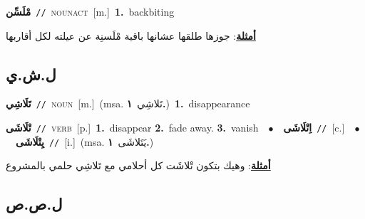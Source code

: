 \documentclass[10pt,a4paper,twoside]{article} %
\begin{document}
\begin{multicols}{2}
{\setlength\topsep{0pt}\textbf{\foreignlanguage{arabic}{مْلَسِّن}}\ {\color{gray}\texttt{//}\color{black}}\ \textsc{noun\textunderscore act}\ [m.]\ \textbf{1.}~backbiting\  \begin{flushright}\color{gray}\foreignlanguage{arabic}{\textbf{\underline{\foreignlanguage{arabic}{أمثلة}}}: جوزها طلقها عشانها باقية مْلَسنِة عن عيلته لكل أقاربها}\end{flushright}\color{black}} \vspace{2mm}

\vspace{-3mm}
\subsection*{\color{blue}\foreignlanguage{arabic}{ل.ش.ي}\color{blue}{}} 

{\setlength\topsep{0pt}\textbf{\foreignlanguage{arabic}{تَلَاشِي}}\ {\color{gray}\texttt{//}\color{black}}\ \textsc{noun}\ [m.]\ \color{gray}(msa. \foreignlanguage{arabic}{تَلاشِي}~\foreignlanguage{arabic}{\textbf{١.}})\color{black}\ \textbf{1.}~disappearance\ } \vspace{2mm}

{\setlength\topsep{0pt}\textbf{\foreignlanguage{arabic}{تْلَاشَى}}\ {\color{gray}\texttt{//}\color{black}}\ \textsc{verb}\ [p.]\ \textbf{1.}~disappear  \textbf{2.}~fade away.  \textbf{3.}~vanish\ \ $\bullet$\ \ \setlength\topsep{0pt}\textbf{\foreignlanguage{arabic}{اِتْلَاشَى}}\ {\color{gray}\texttt{//}\color{black}}\ [c.]\ \ $\bullet$\ \ \setlength\topsep{0pt}\textbf{\foreignlanguage{arabic}{يِتْلَاشَى}}\ {\color{gray}\texttt{//}\color{black}}\ [i.]\ \color{gray}(msa. \foreignlanguage{arabic}{يَتَلاشَى}~\foreignlanguage{arabic}{\textbf{١.}})\color{black}\  \begin{flushright}\color{gray}\foreignlanguage{arabic}{\textbf{\underline{\foreignlanguage{arabic}{أمثلة}}}: وهيك بتكون تْلاشَت كل أحلامي مع تَلاشِي حلمي بالمشروع}\end{flushright}\color{black}} \vspace{2mm}

\vspace{-3mm}
\subsection*{\color{blue}\foreignlanguage{arabic}{ل.ص.ص}\color{blue}{}} 


\end{multicols}
\end{document}
